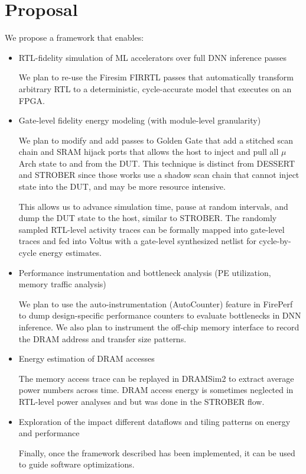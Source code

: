 \documentclass[sigconf]{acmart}
\begin{document}
\section{Proposal}
We propose a framework that enables:
\begin{itemize}
  \item RTL-fidelity simulation of ML accelerators over full DNN inference passes

    We plan to re-use the Firesim FIRRTL passes that automatically transform arbitrary RTL to a deterministic, cycle-accurate model that executes on an FPGA.

  \item Gate-level fidelity energy modeling (with module-level granularity)

    We plan to modify and add passes to Golden Gate that add a stitched scan chain and SRAM hijack ports that allows the host to inject and pull all $\mu$Arch state to and from the DUT.
    This technique is distinct from DESSERT and STROBER since those works use a shadow scan chain that cannot inject state into the DUT, and may be more resource intensive.

    This allows us to advance simulation time, pause at random intervals, and dump the DUT state to the host, similar to STROBER.
    The randomly sampled RTL-level activity traces can be formally mapped into gate-level traces and fed into Voltus with a gate-level synthesized netlist for cycle-by-cycle energy estimates.

  \item Performance instrumentation and bottleneck analysis (PE utilization, memory traffic analysis)

    We plan to use the auto-instrumentation (AutoCounter) feature in FirePerf\cite{fireperf} to dump design-specific performance counters to evaluate bottlenecks in DNN inference.
    We also plan to instrument the off-chip memory interface to record the DRAM address and transfer size patterns.

  \item Energy estimation of DRAM accesses

    The memory access trace can be replayed in DRAMSim2\cite{dramsim2} to extract average power numbers across time.
    DRAM access energy is sometimes neglected in RTL-level power analyses and but was done in the STROBER flow.

  \item Exploration of the impact different dataflows and tiling patterns on energy and performance

    Finally, once the framework described has been implemented, it can be used to guide software optimizations.
\end{itemize}
\end{document}
